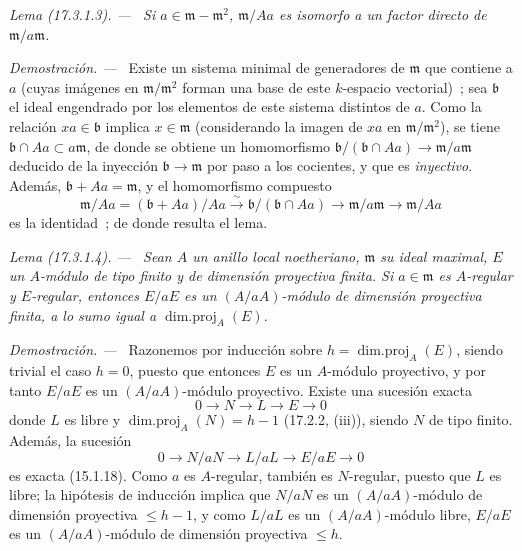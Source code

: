 \documentclass[10pt,oneside]{book}
\makeatletter
\newcommand{\setmanualcurrentlabel}[1]{\def\@currentlabel{#1}}
\newenvironment{lemma}[1][]{%
  \setmanualcurrentlabel{#1}\par\medskip\noindent\itshape Lema (#1). ---\ }{\par}
\newenvironment{proof}{%
  \par\medskip\noindent\textit{Demostración. ---\ }}{\par}
\providecommand{\setmin}{-}%
\makeatother
\begin{document}
\begin{lemma}[17.3.1.3]
\label{0.17.3.1.3-es}
Si $a\in\mathfrak m\setmin\mathfrak{m}^2$, $\mathfrak{m}/Aa$ es isomorfo a un
factor directo de $\mathfrak{m}/a\mathfrak{m}$.
\end{lemma}

\begin{proof}
Existe un sistema minimal de generadores de $\mathfrak{m}$ que contiene a $a$
(cuyas imágenes en $\mathfrak{m}/\mathfrak{m}^2$ forman una base de este
$k$-espacio vectorial)~; sea $\mathfrak{b}$ el ideal engendrado por los elementos
de este sistema distintos de $a$. Como la relación $xa\in\mathfrak{b}$ implica
$x\in\mathfrak{m}$ (considerando la imagen de $xa$ en
$\mathfrak{m}/\mathfrak{m}^2$), se tiene
$\mathfrak{b}\cap Aa\subset a\mathfrak{m}$, de donde se obtiene un homomorfismo
$\mathfrak{b}/(\mathfrak{b}\cap Aa)\longrightarrow
\mathfrak{m}/a\mathfrak{m}$ deducido de la inyección
$\mathfrak{b}\longrightarrow\mathfrak{m}$ por paso a los cocientes, y que
es \emph{inyectivo}. Además, $\mathfrak{b}+Aa=\mathfrak{m}$, y
el homomorfismo compuesto
\[
  \mathfrak{m}/Aa=(\mathfrak{b}+Aa)/Aa
  \xrightarrow{\sim}\mathfrak{b}/(\mathfrak{b}\cap Aa)
  \longrightarrow\mathfrak{m}/a\mathfrak{m}
  \longrightarrow\mathfrak{m}/Aa
\]
es la identidad~; de donde resulta el lema.
\end{proof}

\begin{lemma}[17.3.1.4]
\label{0.17.3.1.4-es}
Sean $A$ un anillo local noetheriano, $\mathfrak{m}$ su ideal maximal, $E$
un $A$-módulo de tipo finito y de dimensión proyectiva finita. Si
$a\in\mathfrak{m}$ es $A$-regular y $E$-regular, entonces $E/aE$ es un
$(A/aA)$-módulo de dimensión proyectiva finita, a lo sumo igual a
$\operatorname{dim.proj}_A(E)$.
\end{lemma}
\begin{proof}
Razonemos por inducción sobre $h=\operatorname{dim.proj}_A(E)$, siendo trivial
el caso $h=0$, puesto que entonces $E$ es un $A$-módulo proyectivo, y por tanto
$E/aE$ es un $(A/aA)$-módulo proyectivo. Existe una sucesión exacta
\[
  0\longrightarrow N\longrightarrow L\longrightarrow E\longrightarrow0
\]
donde $L$ es libre y $\operatorname{dim.proj}_A(N)=h\setmin 1$ (17.2.2, (iii)), siendo
$N$ de tipo finito. Además, la sucesión
\[
  0\longrightarrow N/aN\longrightarrow L/aL\longrightarrow E/aE
  \longrightarrow0
\]
es exacta (15.1.18). Como $a$ es $A$-regular, también es $N$-regular, puesto
que $L$ es libre; la hipótesis de inducción implica que $N/aN$ es un
$(A/aA)$-módulo de dimensión proyectiva $\leq h\setmin 1$, y como $L/aL$ es un
$(A/aA)$-módulo libre, $E/aE$ es un $(A/aA)$-módulo de dimensión proyectiva
$\leq h$.
\end{proof}
\end{document}
